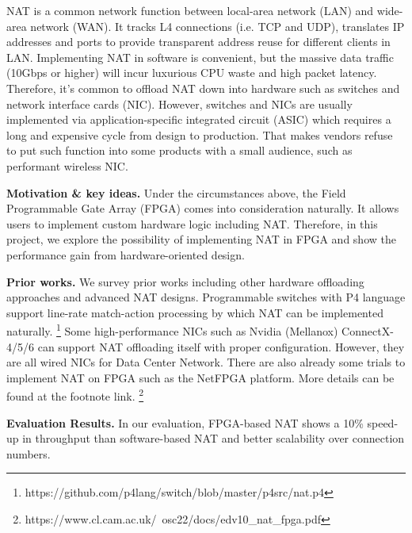 





NAT is a common network function between local-area network (LAN) and wide-area
network (WAN). 
It tracks L4 connections (i.e. TCP and UDP), translates IP addresses and ports to 
provide transparent address reuse for different clients in LAN.
Implementing NAT in software is convenient, but the massive data traffic (10Gbps or higher) will incur luxurious CPU waste and high packet latency. Therefore, it's common to offload NAT down into hardware such as switches and network interface cards (NIC). 
However, switches and NICs are usually implemented via application-specific integrated circuit (ASIC) which requires a long and expensive cycle from design to production. That makes vendors refuse to put such function into some products with a small audience, such as performant wireless NIC. 



\textbf{Motivation \& key ideas.} 
Under the circumstances above, the Field Programmable Gate Array (FPGA) comes into consideration naturally. 
It allows users to implement custom hardware logic including NAT. Therefore, in this project, we explore the possibility of implementing NAT in FPGA and show the performance gain from hardware-oriented design. 

\textbf{Prior works.} We survey prior works including other hardware offloading approaches and advanced NAT designs. Programmable switches with P4 language support line-rate match-action processing by which NAT can be implemented naturally. 
\footnote[1]{https://github.com/p4lang/switch/blob/master/p4src/nat.p4}
Some high-performance NICs such as Nvidia (Mellanox) ConnectX-4/5/6 can support NAT offloading itself with proper configuration. However, they are all wired NICs for Data Center Network.
There are also already some trials to implement NAT on FPGA such as the NetFPGA platform. More details can be found at the footnote link.
\footnote[2]{https://www.cl.cam.ac.uk/~osc22/docs/edv10\_nat\_fpga.pdf}

\textbf{Evaluation Results.} In our evaluation, FPGA-based NAT shows a 10\% speed-up in throughput than software-based NAT and better scalability over connection numbers.

